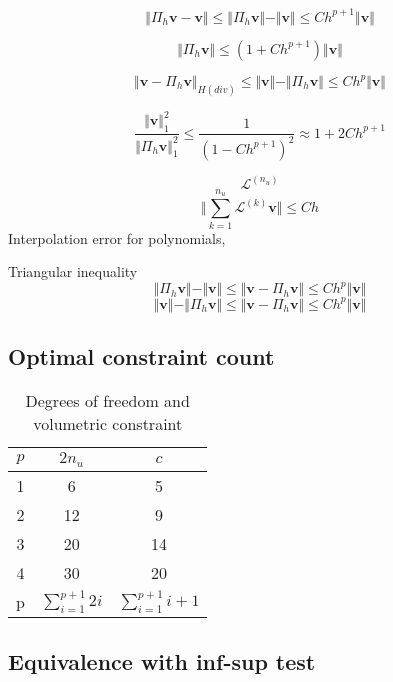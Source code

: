 \begin{equation}
\Vert \Pi_h \boldsymbol v - \boldsymbol v \Vert \le \Vert \Pi_h \boldsymbol v \Vert - \Vert \boldsymbol v \Vert \le Ch^{p+1}\Vert \boldsymbol v \Vert
\end{equation}

\begin{equation}
    \Vert \Pi_h \boldsymbol v \Vert \le (1+Ch^{p+1})\Vert \boldsymbol v \Vert
\end{equation}

\begin{equation}
    \Vert \boldsymbol v - \Pi_h \boldsymbol v \Vert_{H(div)} \le \Vert \boldsymbol v \Vert - \Vert \Pi_h \boldsymbol v \Vert \le Ch^{p}\Vert \boldsymbol v \Vert
\end{equation}

\begin{equation}
\frac{\Vert \boldsymbol v \Vert_1^2}{\Vert \Pi_h \boldsymbol v \Vert_1^2} \le \frac{1}{(1-Ch^{p+1})^2} \approx 1 + 2Ch^{p+1}
\end{equation}

\begin{equation}
    \mathcal L^{(n_u)}
\end{equation}
\begin{equation}
    \Vert \sum_{k=1}^{n_u} \mathcal L^{(k)} \boldsymbol v \Vert \le C h
\end{equation}
Interpolation error for polynomials, 

Triangular inequality
\begin{equation}
\Vert \Pi_h \boldsymbol v \Vert - \Vert \boldsymbol v \Vert \le \Vert \boldsymbol v - \Pi_h \boldsymbol v \Vert \le Ch^{p} \Vert \boldsymbol v \Vert
\end{equation}
\begin{equation}
\Vert \boldsymbol v \Vert - \Vert \Pi_h \boldsymbol v \Vert \le \Vert \boldsymbol v - \Pi_h \boldsymbol v \Vert \le Ch^{p} \Vert \boldsymbol v \Vert
\end{equation}

\subsection{Optimal constraint count}
\begin{table}[ht!]
\centering
\caption{Degrees of freedom and volumetric constraint}
\begin{tabular}{ccc}
\toprule
$p$ & $2n_u$ & $c$ \\
\midrule
1 & 6 & 5 \\
2 & 12 & 9 \\
3 & 20 & 14 \\
4 & 30 & 20 \\
p & $\sum_{i=1}^{p+1}2i$ & $\sum_{i=1}^{p+1}i+1$ \\
\bottomrule
\end{tabular}

\subsection{Equivalence with inf-sup test}
\end{table}
